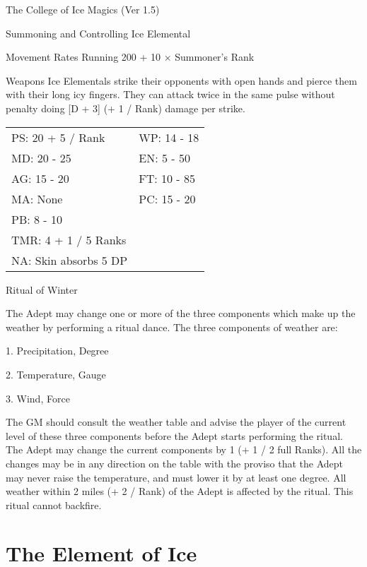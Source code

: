 \begin{Chapter}{The College of Ice Magics (Ver 1.5)}
\begin{ritual}[R-2]{Summoning and Controlling Ice Elemental}
\begin{effects}
\begin{Description}
\item[Movement Rates] Running 200 + 10 × Summoner’s Rank

\item[Weapons] Ice Elementals strike their opponents with open hands
  and pierce them with their long icy fingers. They can attack twice
  in the same pulse without penalty doing [D + 3] (+ 1 / Rank) damage
  per strike.
\end{Description}

\begin{tabularx}{\linewidth}{XX}
PS: 20 + 5 / Rank	& WP: 14 - 18 \\
MD: 20 - 25		& EN: 5 - 50 \\
AG: 15 - 20		& FT: 10 - 85 \\
MA: None		& PC: 15 - 20 \\
PB: 8 - 10		& \\
TMR: 4 + 1 / 5 Ranks	& \\
NA: Skin absorbs 5 DP	& \\
\end{tabularx}
\end{effects}
\end{ritual}

\begin{ritual}[R-3]{Ritual of Winter}

\begin{effects}
The Adept may change one or more of the three components which make up
the weather by performing a ritual dance. The three components of
weather are:

1. Precipitation, Degree 

2. Temperature, Gauge 

3. Wind, Force 

The GM should consult the weather table and advise the player of the
current level of these three components before the Adept starts
performing the ritual.  The Adept may change the current components by
1 (+ 1 / 2 full Ranks).  All the changes may be in any direction on
the table with the proviso that the Adept may never raise the
temperature, and must lower it by at least one degree.  All weather
within 2 miles (+ 2 / Rank) of the Adept is affected by the
ritual. This ritual cannot backfire.
\end{effects}
\end{ritual}

\section{The Element of Ice}


\end{Chapter}
